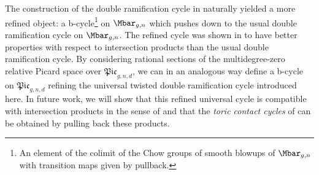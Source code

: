 \documentclass[a4paper,12pt]{article} %
\newcommand{\bb}[1]{{\mathbb{#1}}}
\newcommand{\ca}[1]{{\mathcal{#1}}}
\theoremstyle{definition}
\theoremstyle{plain}%
\newcommand{\Picabs}{\mathfrak{Pic}}
\newcommand{\Picrel}{\mathfrak{Pic}^{\mathrm{rel}}}
\newcounter{nootje}
\newcommand\todo[1]{[*\thenootje]\marginpar{\tiny\begin{minipage}
{20mm}\begin{flushleft}\thenootje : 
#1\end{flushleft}\end{minipage}}\addtocounter{nootje}{1}}
\newcommand{\DRop}{\mathsf{DR}^{\mathsf{op}}}
\begin{document}
The construction of the double ramification cycle in \cite{Holmes2017Extending-the-d} naturally yielded a more refined object: a b-cycle\footnote{An element of the colimit of the Chow groups of smooth blowups of $\Mbar_{g,n}$ with transition maps given by pullback.} on $\Mbar_{g,n}$ which pushes down to the usual double ramification cycle on $\Mbar_{g,n}$. 
The refined cycle was shown in \cite{Holmes2017Multiplicativit} to have better properties with respect to intersection products than the usual double ramification cycle. By considering rational sections of the multidegree-zero relative Picard space over $\Picabs_{g,n,d}$, we can in an analogous way define a b-cycle on $\Picabs_{g,n,d}$ refining the universal twisted double ramification cycle introduced here. In future work, we will show that this refined universal cycle is compatible with intersection products in the sense of \cite{Holmes2017Multiplicativit} and that the \emph{toric contact cycles} of \cite{Ranganathan2019A-note-on-cycle} can be obtained by pulling back these products. 






\end{document}

